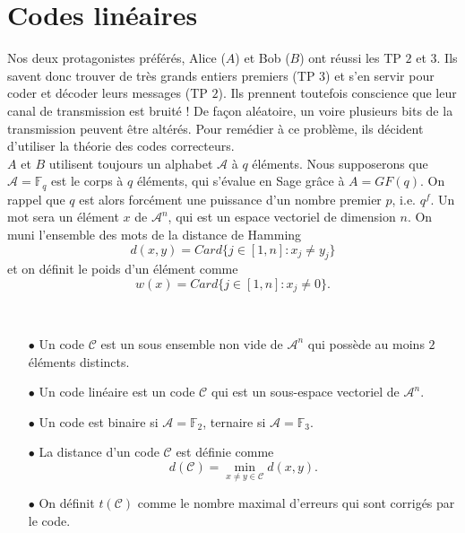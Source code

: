 \section{Codes linéaires}


Nos deux protagonistes préférés, Alice ($A$) et Bob ($B$) ont réussi les TP $2$ et $3$. Ils savent donc trouver de très grands entiers premiers (TP $3$) et s'en servir pour coder et décoder leurs messages (TP $2$). Ils prennent toutefois conscience que leur canal de transmission est bruité ! De façon aléatoire, un voire plusieurs bits de la transmission peuvent être altérés. Pour remédier à ce problème, ils décident d'utiliser la théorie des codes correcteurs.\\

$A$ et $B$ utilisent toujours un alphabet $\mathcal A$ à $q$ éléments. Nous supposerons que $\mathcal A = \mathbb F_q $ est le corps à $q$ éléments, qui s'évalue en Sage grâce à $A=GF(q)$. On rappel que $q$ est alors forcément une puissance d'un nombre premier $p$, i.e. $q^f$. Un mot sera un élément $x$ de $\mathcal A^n$, qui est un espace vectoriel de dimension $n$. On muni l'ensemble des mots de la distance de Hamming
\[d(x,y)=Card \{j\in [1,n] : x_j\neq y_j\}\]
et on définit le poids d'un élément comme
\[w(x)=Card \{j\in [1,n] : x_j\neq 0\}.\]
\begin{definition}\
\begin{itemize}
\item[$\bullet$] Un code $\mathcal C$ est un sous ensemble non vide de $\mathcal A^n$ qui possède au moins $2$ éléments distincts.
\item[$\bullet$] Un code linéaire est un code $\mathcal C$ qui est un sous-espace vectoriel de $\mathcal A ^n$.
\item[$\bullet$] Un code est binaire si $\mathcal A=\mathbb F_2$, ternaire si $\mathcal A = \mathbb F_3$.
\item[$\bullet$] La distance d'un code $\mathcal C$ est définie comme \[d(\mathcal C)=\min_{x\neq y \in \mathcal C} d(x,y).\]
\item[$\bullet$] On définit $t(\mathcal C)$ comme le nombre maximal d'erreurs qui sont corrigés par le code.
\end{itemize}
\end{definition}

